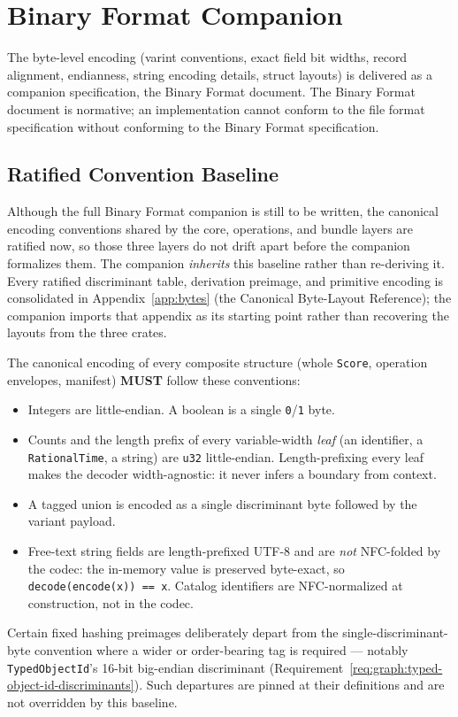 \documentclass[11pt,letterpaper]{report}
\newcounter{requirement}[chapter]
\newcommand{\MUST}{\textbf{MUST}}
\begin{document}
\section{Binary Format Companion}
\label{sec:format:binary}

The byte-level encoding (varint conventions, exact field bit widths,
record alignment, endianness, string encoding details, struct
layouts) is delivered as a companion specification, the Binary
Format document. The Binary Format document is normative; an
implementation cannot conform to the file format specification
without conforming to the Binary Format specification.

\subsection{Ratified Convention Baseline}
\label{sec:format:codec-baseline}

Although the full Binary Format companion is still to be written, the
canonical encoding conventions shared by the core, operations, and
bundle layers are ratified now, so those three layers do not drift
apart before the companion formalizes them. The companion
\emph{inherits} this baseline rather than re-deriving it. Every
ratified discriminant table, derivation preimage, and primitive
encoding is consolidated in
Appendix~\ref{app:bytes} (the Canonical Byte-Layout Reference); the
companion imports that appendix as its starting point rather than
recovering the layouts from the three crates.

\begin{requirement}
  \label{req:format:codec-conventions}
  The canonical encoding of every composite structure (whole
  \texttt{Score}, operation envelopes, manifest) \MUST{} follow these
  conventions:
  \begin{itemize}
    \item Integers are little-endian. A boolean is a single
      \texttt{0}/\texttt{1} byte.
    \item Counts and the length prefix of every variable-width
      \emph{leaf} (an identifier, a \texttt{RationalTime}, a string)
      are \texttt{u32} little-endian. Length-prefixing every leaf
      makes the decoder width-agnostic: it never infers a boundary
      from context.
    \item A tagged union is encoded as a single discriminant byte
      followed by the variant payload.
    \item Free-text string fields are length-prefixed UTF-8 and are
      \emph{not} NFC-folded by the codec: the in-memory value is
      preserved byte-exact, so \texttt{decode(encode(x)) == x}.
      Catalog identifiers are NFC-normalized at construction, not in
      the codec.
  \end{itemize}

  Certain fixed hashing preimages deliberately depart from the
  single-discriminant-byte convention where a wider or order-bearing
  tag is required --- notably \texttt{TypedObjectId}'s 16-bit
  big-endian discriminant
  (Requirement~\ref{req:graph:typed-object-id-discriminants}). Such
  departures are pinned at their definitions and are not overridden by
  this baseline.
\end{requirement}
\end{document}
